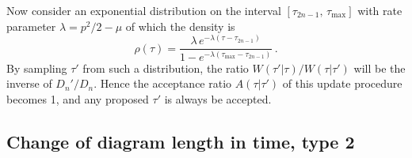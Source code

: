 Now consider an exponential distribution on the interval $ [\tau_{2n - 1}, \, \tau_\text{max}] $ with rate parameter $ \lambda = p^2/2 - \mu $ of which the density is
\begin{equation}
	\rho(\tau) = \frac{\lambda \, e^{-\lambda (\tau - \tau_{2n - 1})}}{1 - e^{- \lambda (\tau_\text{max} - \tau_{2n - 1})}} \,.
\end{equation}
By sampling $ \tau' $ from such a distribution, the ratio $ W(\tau' | \tau)/W(\tau | \tau') $ will be the inverse of $ D_n'/D_n $. Hence the acceptance ratio $ A(\tau | \tau') $ of this update procedure becomes 1, and any proposed $ \tau' $ is always be accepted.

\subsection*{Change of diagram length in time, type 2}

